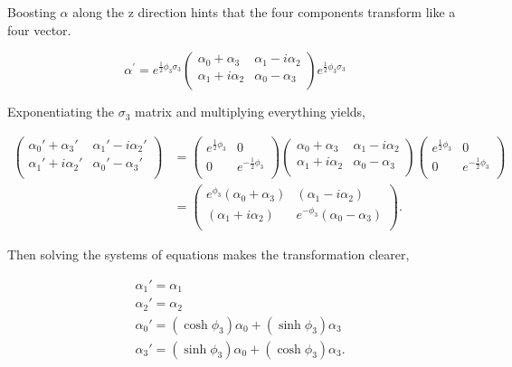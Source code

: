 Boosting $\alpha$ along the z direction hints that the four components transform like a four vector.  

\begin{equation}
\alpha^{'} = e^{\frac{1}{2}\phi_3 \sigma_3} 
\begin{pmatrix}
\alpha_0 + \alpha_3 & \alpha_1 - i\alpha_2 \\
\alpha_1 + i\alpha_2 & \alpha_0 - \alpha_3 \\
\end{pmatrix}
e^{\frac{1}{2}\phi_3 \sigma_3}
\end{equation}

Exponentiating the $\sigma_3$ matrix and multiplying everything yields,

\begin{equation}
\begin{split}
\begin{pmatrix}
\alpha_0' + \alpha_3' & \alpha_1' - i\alpha_2' \\
\alpha_1' + i\alpha_2' & \alpha_0' - \alpha_3' \\
\end{pmatrix}
&=
\begin{pmatrix}
e^{\frac{1}{2}\phi_3} & 0 \\
0 & e^{-\frac{1}{2}\phi_3} \\
\end{pmatrix}
\begin{pmatrix}
\alpha_0 + \alpha_3 & \alpha_1 - i\alpha_2 \\
\alpha_1 + i\alpha_2 & \alpha_0 - \alpha_3 \\
\end{pmatrix}
\begin{pmatrix}
e^{\frac{1}{2}\phi_3} & 0 \\
0 & e^{-\frac{1}{2}\phi_3} \\
\end{pmatrix} \\
&=
\begin{pmatrix}
e^{\phi_3}(\alpha_0 + \alpha_3) & (\alpha_1 - i\alpha_2) \\
(\alpha_1 + i\alpha_2) & e^{-\phi_3}(\alpha_0 - \alpha_3) \\
\end{pmatrix}.
\end{split}
\end{equation}

Then solving the systems of equations makes the transformation clearer,

\begin{equation}
\begin{split}
&\alpha_1' = \alpha_1 \\
&\alpha_2' = \alpha_2 \\
&\alpha_0' = (\cosh\phi_3) \alpha_0 +  (\sinh\phi_3) \alpha_3 \\ 
&\alpha_3' = (\sinh\phi_3) \alpha_0 +  (\cosh\phi_3) \alpha_3. \\ 
\end{split}
\end{equation}


